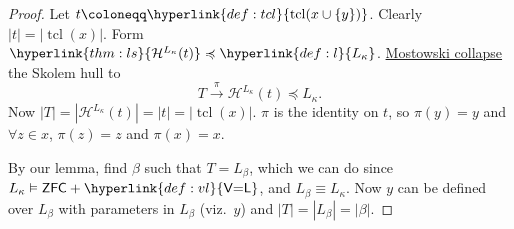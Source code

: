 \documentclass{article}
\newcommand{\1}{\mathbbm{1}}
\DeclareMathOperator{\tcl}{tcl}
\let\models\vDash
\begin{document}
\begin{proof}
  Let $t \coloneqq \hyperlink{def:tcl}{\tcl(x \cup \{y\})}$.
  Clearly $|t| = |\tcl(x)|$. Form $\hyperlink{thm:ls}{\mathcal{H}^{L_\kappa}(t)} \preccurlyeq \hyperlink{def:l}{L_\kappa}$.
  \hyperlink{thm:mct}{Mostowski collapse} the Skolem hull to
  \begin{equation*}
    T \xrightarrow{\pi} \mathcal{H}^{L_\kappa}(t) \preccurlyeq L_\kappa.
  \end{equation*}
  Now $|T| = |\mathcal{H}^{L_\kappa}(t)| = |t| = |\tcl(x)|$.
  $\pi$ is the identity on $t$, so $\pi(y) = y$ and $\forall z \in x$, $\pi(z) = z$ and $\pi(x) = x$.

  By our lemma, find $\beta$ such that $T = L_\beta$, which we can do since $L_\kappa \models \textsf{ZFC}+\hyperlink{def:vl}{\textsf{V=L}}$, and $L_\beta \equiv L_\kappa$.
  Now $y$ can be defined over $L_\beta$ with parameters in $L_\beta$ (viz.\ $y$) and $|T| = |L_\beta| = |\beta|$.
\end{proof}
\end{document}
